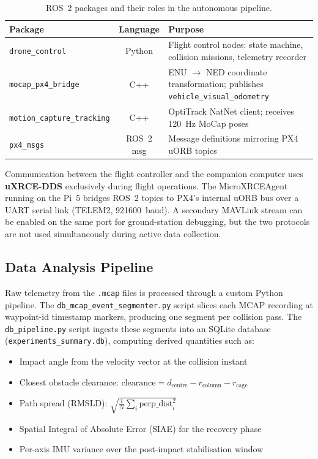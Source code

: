 \begin{table}[htbp]
\centering
\caption{ROS~2 packages and their roles in the autonomous pipeline.}
\label{tab:software_components}
\begin{tabular}{lcp{7cm}}
\toprule
\textbf{Package} & \textbf{Language} & \textbf{Purpose} \\
\midrule
\texttt{drone\_control} & Python & Flight control nodes: state machine, collision missions, telemetry recorder \\
\texttt{mocap\_px4\_bridge} & C++ & ENU $\to$ NED coordinate transformation; publishes \texttt{vehicle\_visual\_odometry} \\
\texttt{motion\_capture\_tracking} & C++ & OptiTrack NatNet client; receives 120~Hz MoCap poses \\
\texttt{px4\_msgs} & ROS~2 msg & Message definitions mirroring PX4 uORB topics \\
\bottomrule
\end{tabular}
\end{table}

Communication between the flight controller and the companion computer uses \textbf{uXRCE-DDS} exclusively during flight operations. The MicroXRCEAgent running on the Pi~5 bridges ROS~2 topics to PX4's internal uORB bus over a UART serial link (TELEM2, 921600~baud). A secondary MAVLink stream can be enabled on the same port for ground-station debugging, but the two protocols are not used simultaneously during active data collection.

\subsection{Data Analysis Pipeline}

Raw telemetry from the \texttt{.mcap} files is processed through a custom Python pipeline. The \texttt{db\_mcap\_event\_segmenter.py} script slices each MCAP recording at waypoint-id timestamp markers, producing one segment per collision pass. The \texttt{db\_pipeline.py} script ingests these segments into an SQLite database (\texttt{experiments\_summary.db}), computing derived quantities such as:

\begin{itemize}
    \item Impact angle from the velocity vector at the collision instant
    \item Closest obstacle clearance: $\mathrm{clearance} = d_{\mathrm{centre}} - r_{\mathrm{column}} - r_{\mathrm{cage}}$
    \item Path spread (RMSLD): $\sqrt{\frac{1}{N}\sum_i \mathrm{perp\_dist}_i^2}$
    \item Spatial Integral of Absolute Error (SIAE) for the recovery phase
    \item Per-axis IMU variance over the post-impact stabilisation window
\end{itemize}

